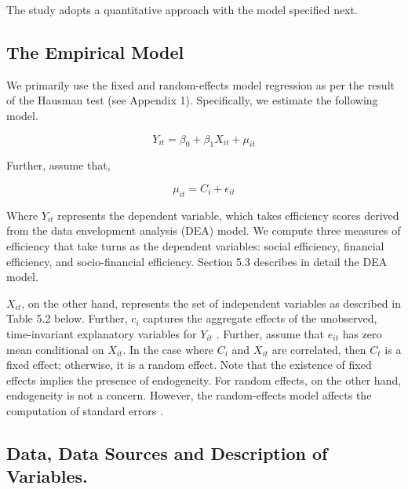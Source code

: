 \documentclass[a4paper, nobind]{templates/ociamthesis}
\begin{document}
The study adopts a quantitative approach with the model specified next.

\hypertarget{the-empirical-model}{%
\subsection{The Empirical Model}\label{the-empirical-model}}

We primarily use the fixed and random-effects model regression as per the result of the Hausman test (see Appendix 1). Specifically, we estimate the following model.

\begin{equation}
Y_{it} = \beta_{0} + \beta_{1}X_{it} + \mu_{it}
\end{equation}

Further, assume that,

\begin{equation}
\mu_{it} = C_{i} + \epsilon_{it}
\end{equation}

Where \(Y_{it}\) represents the dependent variable, which takes efficiency scores derived from the data envelopment analysis (DEA) model. We compute three measures of efficiency that take turns as the dependent variables: social efficiency, financial efficiency, and socio-financial efficiency. Section 5.3 describes in detail the DEA model.

\(X_{it}\), on the other hand, represents the set of independent variables as described in Table 5.2 below. Further, \(c_{i}\) captures the aggregate effects of the unobserved, time-invariant explanatory variables for \(Y_{it}\) . Further, assume that \(e_{it}\) has zero mean conditional on \(X_{it}\). In the case where \(C_{i}\) and \(X_{it}\) are correlated, then \(C_{t}\) is a fixed effect; otherwise, it is a random effect. Note that the existence of fixed effects implies the presence of endogeneity. For random effects, on the other hand, endogeneity is not a concern. However, the random-effects model affects the computation of standard errors \autocite{roberts2013endogeneity}.

\hypertarget{data-data-sources-and-description-of-variables.}{%
\subsection{Data, Data Sources and Description of Variables.}\label{data-data-sources-and-description-of-variables.}}
\end{document}
